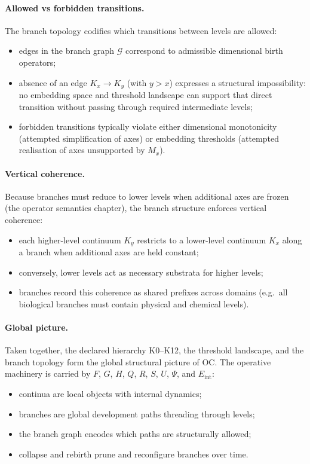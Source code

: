 \paragraph{Allowed vs forbidden transitions.}
The branch topology codifies which transitions between levels are allowed:
\begin{itemize}
  \item edges in the branch graph \(\mathcal{G}\) correspond to admissible
        dimensional birth operators;
  \item absence of an edge \(K_x \to K_y\) (with \(y>x\)) expresses a
        structural impossibility: no embedding space and threshold landscape
        can support that direct transition without passing through required
        intermediate levels;
  \item forbidden transitions typically violate either dimensional
        monotonicity (attempted simplification of axes) or embedding
        thresholds (attempted realisation of axes unsupported by \(M_x\)).
\end{itemize}

\paragraph{Vertical coherence.}
Because branches must reduce to lower levels when additional axes are frozen
(the operator semantics chapter), the branch structure enforces vertical
coherence:
\begin{itemize}
  \item each higher-level continuum \(K_y\) restricts to a lower-level
        continuum \(K_x\) along a branch when additional axes are held
        constant;
  \item conversely, lower levels act as necessary substrata for higher levels;
  \item branches record this coherence as shared prefixes across domains
        (e.g.\ all biological branches must contain physical and chemical
        levels).
\end{itemize}

\paragraph{Global picture.}
Taken together, the declared hierarchy K0--K12, the threshold
landscape, and the branch topology form the global structural picture of OC.
The operative machinery is carried by \(F\), \(G\), \(H\), \(Q\), \(R\),
\(S\), \(U\), \(\Psi\), and \(E_{\mathrm{int}}\):
\begin{itemize}
  \item continua are local objects with internal dynamics;
  \item branches are global development paths threading through levels;
  \item the branch graph encodes which paths are structurally allowed;
  \item collapse and rebirth prune and reconfigure branches over time.
\end{itemize}

